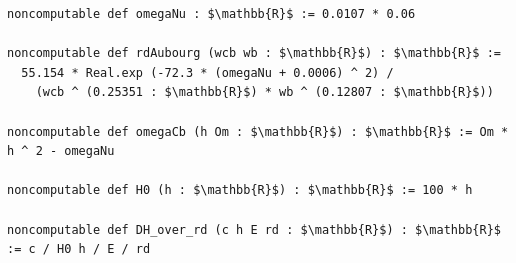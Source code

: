 \begin{lstlisting}[mathescape]
noncomputable def omegaNu : $\mathbb{R}$ := 0.0107 * 0.06

noncomputable def rdAubourg (wcb wb : $\mathbb{R}$) : $\mathbb{R}$ :=
  55.154 * Real.exp (-72.3 * (omegaNu + 0.0006) ^ 2) /
    (wcb ^ (0.25351 : $\mathbb{R}$) * wb ^ (0.12807 : $\mathbb{R}$))

noncomputable def omegaCb (h Om : $\mathbb{R}$) : $\mathbb{R}$ := Om * h ^ 2 - omegaNu

noncomputable def H0 (h : $\mathbb{R}$) : $\mathbb{R}$ := 100 * h

noncomputable def DH_over_rd (c h E rd : $\mathbb{R}$) : $\mathbb{R}$ := c / H0 h / E / rd
\end{lstlisting}

